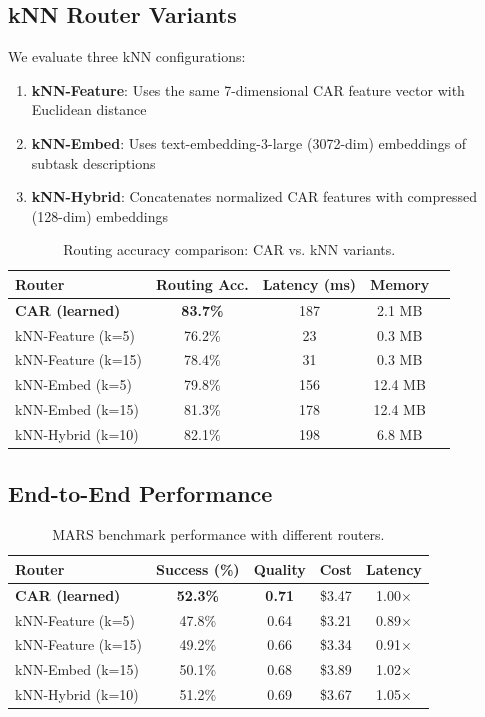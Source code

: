 \documentclass{article}
\theoremstyle{plain}
\theoremstyle{definition}
\theoremstyle{remark}
\begin{document}
\subsection{kNN Router Variants}

We evaluate three kNN configurations:
\begin{enumerate}[nosep,leftmargin=*]
\item \textbf{kNN-Feature}: Uses the same 7-dimensional CAR feature vector with Euclidean distance
\item \textbf{kNN-Embed}: Uses text-embedding-3-large (3072-dim) embeddings of subtask descriptions
\item \textbf{kNN-Hybrid}: Concatenates normalized CAR features with compressed (128-dim) embeddings
\end{enumerate}

\begin{table}[h]
\centering
\caption{Routing accuracy comparison: CAR vs. kNN variants.}
\label{tab:knn-routing}
\small
\begin{tabular}{lcccc}
\toprule
\textbf{Router} & \textbf{Routing Acc.} & \textbf{Latency (ms)} & \textbf{Memory} \\
\midrule
\textbf{CAR (learned)} & \textbf{83.7\%} & 187 & 2.1 MB \\
kNN-Feature (k=5) & 76.2\% & 23 & 0.3 MB \\
kNN-Feature (k=15) & 78.4\% & 31 & 0.3 MB \\
kNN-Embed (k=5) & 79.8\% & 156 & 12.4 MB \\
kNN-Embed (k=15) & 81.3\% & 178 & 12.4 MB \\
kNN-Hybrid (k=10) & 82.1\% & 198 & 6.8 MB \\
\bottomrule
\end{tabular}
\end{table}

\subsection{End-to-End Performance}

\begin{table}[h]
\centering
\caption{MARS benchmark performance with different routers.}
\label{tab:knn-e2e}
\small
\begin{tabular}{lcccc}
\toprule
\textbf{Router} & \textbf{Success (\%)} & \textbf{Quality} & \textbf{Cost} & \textbf{Latency} \\
\midrule
\textbf{CAR (learned)} & \textbf{52.3\%} & \textbf{0.71} & \$3.47 & 1.00$\times$ \\
kNN-Feature (k=5) & 47.8\% & 0.64 & \$3.21 & 0.89$\times$ \\
kNN-Feature (k=15) & 49.2\% & 0.66 & \$3.34 & 0.91$\times$ \\
kNN-Embed (k=15) & 50.1\% & 0.68 & \$3.89 & 1.02$\times$ \\
kNN-Hybrid (k=10) & 51.2\% & 0.69 & \$3.67 & 1.05$\times$ \\
\bottomrule
\end{tabular}
\end{table}
\end{document}
